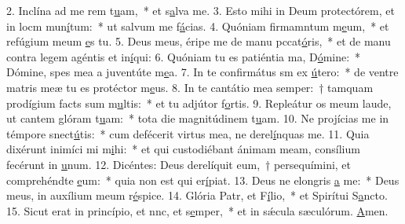 2. Inclína ad me rem t\uline{u}am,~* et s\uline{a}lva me.
3. Esto mihi in Deum protectórem, et in locm mun\uline{í}tum:~* ut salvum me f\uline{á}cias.
4. Quóniam firmamntum m\uline{e}um,~* et refúgium meum \uline{e}s tu.
5. Deus meus, éripe me de manu pccat\uline{ó}ris,~* et de manu contra legem agéntis et in\uline{í}qui:
6. Quóniam tu es patiéntia ma, D\uline{ó}mine:~* Dómine, spes mea a juventúte m\uline{e}a.
7. In te confirmátus sm ex \uline{ú}tero:~* de ventre matris meæ tu es protéctor m\uline{e}us.
8. In te cantátio mea semper:~† tamquam prodígium facts sum m\uline{u}ltis:~* et tu adjútor f\uline{o}rtis.
9. Repleátur os meum laude, ut cantem glóram t\uline{u}am:~* tota die magnitúdinem t\uline{u}am.
10. Ne projícias me in témpore snect\uline{ú}tis:~* cum defécerit virtus mea, ne derel\uline{í}nquas me.
11. Quia dixérunt inimíci mi m\uline{i}hi:~* et qui custodiébant ánimam meam, consílium fecérunt in \uline{u}num.
12. Dicéntes: Deus derelíquit eum,~† persequímini, et comprehéndte \uline{e}um:~* quia non est qui er\uline{í}piat.
13. Deus ne elongris \uline{a} me:~* Deus meus, in auxílium meum r\uline{é}spice.
14. Glória Patr, et F\uline{í}lio,~* et Spirítui S\uline{a}ncto.
15. Sicut erat in princípio, et nnc, et s\uline{e}mper,~* et in sǽcula sæculórum. \uline{A}men.
